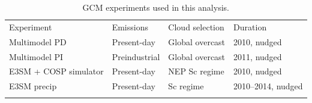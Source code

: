 \documentclass[acp, manuscript]{copernicus}\usepackage[]{graphicx}\usepackage[]{xcolor}
\begin{document}
\begin{table}[t]
  \caption{GCM experiments used in this analysis.}
  \label{tab:exp}
  \begin{tabular}{llll}
    \tophline
    Experiment & Emissions & Cloud selection & Duration \\
    \middlehline
    Multimodel PD & Present-day & Global overcast & 2010, nudged \\
    Multimodel PI & Preindustrial & Global overcast & 2011, nudged \\
    E3SM + COSP simulator & Present-day & NEP Sc regime & 2010, nudged \\
    E3SM precip & Present-day & Sc regime & 2010--2014, nudged \\
    \bottomhline
  \belowtable{} %
  \end{tabular}
\end{table}
%
\clearpage
%
    
    

\end{document}
